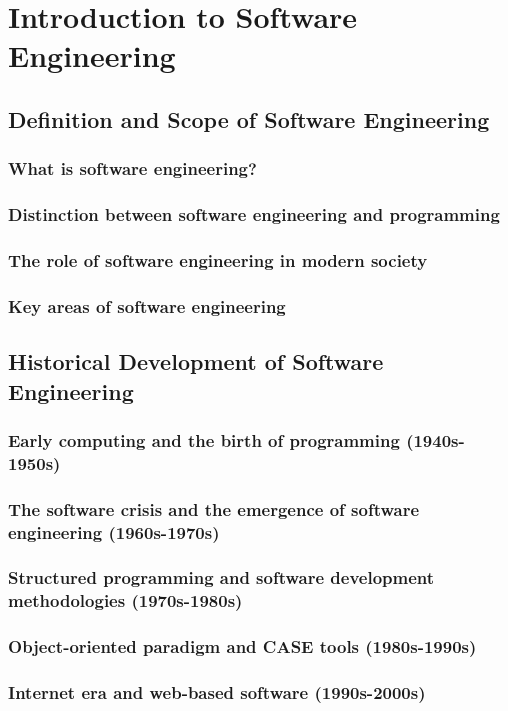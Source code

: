 \chapter{Introduction to Software Engineering}

\section{Definition and Scope of Software Engineering}
\subsection{What is software engineering?}
\subsection{Distinction between software engineering and programming}
\subsection{The role of software engineering in modern society}
\subsection{Key areas of software engineering}

\newpage

\section{Historical Development of Software Engineering}
\subsection{Early computing and the birth of programming (1940s-1950s)}
\subsection{The software crisis and the emergence of software engineering (1960s-1970s)}
\subsection{Structured programming and software development methodologies (1970s-1980s)}
\subsection{Object-oriented paradigm and CASE tools (1980s-1990s)}
\subsection{Internet era and web-based software (1990s-2000s)}
